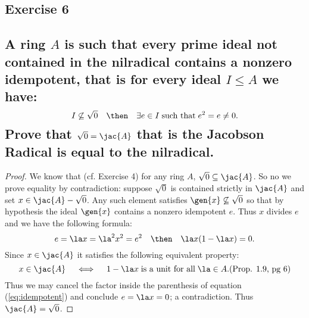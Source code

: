 \subsection*{Exercise 6}
\subsection*{%
  A ring $A$ is such that every prime ideal not contained in the nilradical contains a
  nonzero idempotent, that is for every ideal $I\leq A$ we have:
  \[
    I\not\subseteq \sqrt{0} \quad\then\quad \exists e\in I \;\text{such that}\; e^2=e\neq 0.
  \]
  Prove that $\sqrt{0}=\jac{A}$ that is the Jacobson Radical is equal to the nilradical.
}

\begin{proof}%

We know that (cf. Exercise 4) for any ring $A$, $\sqrt{0}\subseteq\jac{A}$. So no we prove
equality by contradiction: suppose $\sqrt{0}$ is contained strictly in $\jac{A}$
and set $x\in\jac{A}-\sqrt{0}$. Any such element satisfies $\gen{x}\not\subseteq \sqrt{0}$
so that by hypothesis the ideal $\gen{x}$ contains a nonzero idempotent $e$. Thus $x$
divides $e$ and we have the following formula:
\begin{equation}\label{eq:idempotent}
	e=\la x =\la^2 x^2 = e^2 \quad\then\quad \la x(1-\la x)=0.
\end{equation}
Since $x\in\jac{A}$ it satisfies the following equivalent property:
\[
	x\in\jac{A} \quad\iff\quad 1-\la x\;\text{is a unit for all}\; \la\in A.%
	\text{(Prop. 1.9, pg 6)}
\]
Thus we may cancel the factor inside the parenthesis of equation (\ref{eq:idempotent}) and
conclude $e=\la x =0$; a contradiction. Thus $\jac{A}=\sqrt{0}$.
%
\end{proof}%

